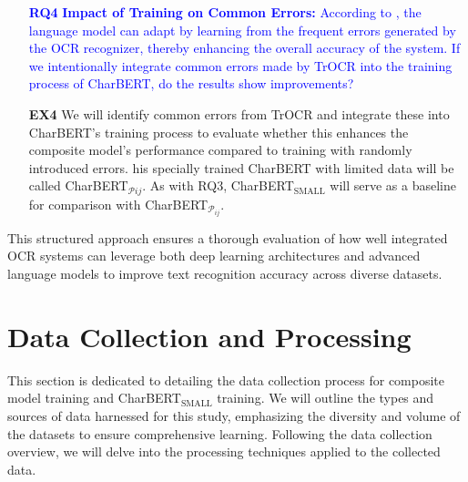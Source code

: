 \begin{itemize}
    \vspace{7mm}
    \item[\textcolor{Blue}{\textbf{RQ4}}] \textcolor{Blue}{\textbf{Impact of Training on Common Errors:} According to \cite{kang2021candidate}, the language model can adapt by learning from the frequent errors generated by the OCR recognizer, thereby enhancing the overall accuracy of the system. If we intentionally integrate common errors made by TrOCR into the training process of CharBERT, do the results show improvements?}
    \item[\textbf{EX4}] We will identify common errors from TrOCR and integrate these into CharBERT's training process to evaluate whether this enhances the composite model's performance compared to training with randomly introduced errors. his specially trained CharBERT with limited data will be called CharBERT$_{\mathcal{P}{ij}}$. As with RQ3, CharBERT$_{\text{SMALL}}$ will serve as a baseline for comparison with CharBERT$_{\mathcal{P}_{ij}}$.
\end{itemize}

This structured approach ensures a thorough evaluation of how well integrated OCR systems can leverage both deep learning architectures and advanced language models to improve text recognition accuracy across diverse datasets.
\section{Data Collection and Processing}
\label{sec:3_data_collection_and_processing}
This section is dedicated to detailing the data collection process for composite model training and CharBERT$_{\text{SMALL}}$ training. We will outline the types and sources of data harnessed for this study, emphasizing the diversity and volume of the datasets to ensure comprehensive learning. Following the data collection overview, we will delve into the processing techniques applied to the collected data.
